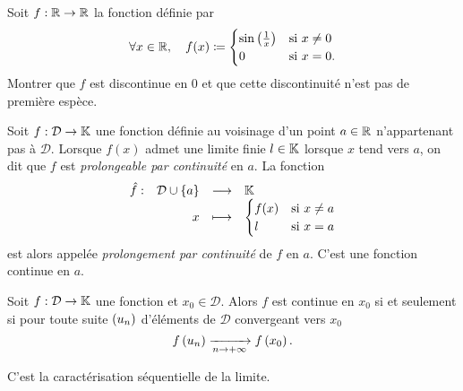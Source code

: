\documentclass{magnolia}
\begin{document}
\begin{exoUnique}
\exo Soit $f:\mathbb{R}\to\mathbb{R}$ la fonction définie par
  \[\forall x\in\mathbb{R},\quad f(x)\coloneqq\begin{cases}\sin\left(\frac{1}{x}\right) & \text{si $x\neq 0$}\\
    0 & \text{si $x=0$.}\end{cases}\]
  Montrer que $f$ est discontinue en 0 et que cette discontinuité n'est pas de première
  espèce.
\end{exoUnique}

\begin{definition}[utile=-3]
Soit $f:\mathcal{D}\to\mathbb{K}$ une fonction définie au voisinage d'un point $a\in\mathbb{R}$ n'appartenant pas
à $\mathcal{D}$. Lorsque $f(x)$ admet une limite finie $l\in\mathbb{K}$ lorsque $x$
tend vers $a$, on dit que $f$ est \emph{prolongeable par continuité} en $a$. La fonction
\[\begin{array}[t]{lrcl} \displaystyle{\hat{f}} : & \displaystyle{\mathcal{D} \cup\left\{a\right\}} & \longrightarrow & \displaystyle{\ensuremath{\mathbb{K}}} \\ & \displaystyle{x} & \longmapsto & \displaystyle{
  \begin{cases}
  f(x) & \text{si $x\neq a$}\\
  l      & \text{si $x=a$}  
  \end{cases}} \end{array}\]
est alors appelée \emph{prolongement par continuité} de $f$ en $a$. C'est une fonction
continue en $a$.
\end{definition}
  

\begin{proposition}[utile=-3]
Soit $f:\mathcal{D}\to\mathbb{K}$ une fonction et $x_0\in\mathcal{D}$. Alors $f$ est continue en $x_0$
si et seulement si pour toute suite $\left(u_n\right)$ d'éléments de $\mathcal{D}$
convergeant vers $x_0$
\[f\left(u_n\right) \xrightarrow[n\rightarrow +\infty]{} f\left(x_0\right).\]
\end{proposition}

\begin{preuve}
C'est la caractérisation séquentielle de la limite.
\end{preuve}
\end{document}
